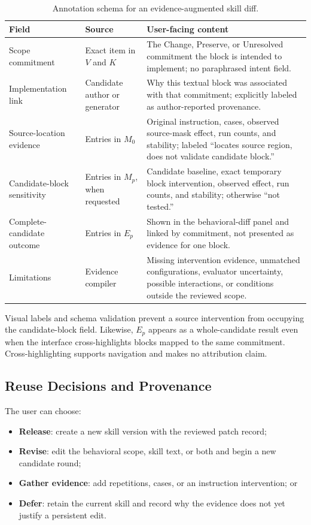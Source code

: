 \begin{table}[t]
    \caption{Annotation schema for an evidence-augmented skill diff.}
    \label{tab:diff-annotation-schema}
    \small
    \begin{tabularx}{\textwidth}{@{}p{}p{}Y@{}}
        \toprule
        \textbf{Field} & \textbf{Source} & \textbf{User-facing content} \\
        \midrule
        Scope commitment & Exact item in $V$ and $K$ & The Change, Preserve, or Unresolved commitment the block is intended to implement; no paraphrased intent field. \\
        Implementation link & Candidate author or generator & Why this textual block was associated with that commitment; explicitly labeled as author-reported provenance. \\
        Source-location evidence & Entries in $M_0$ & Original instruction, cases, observed source-mask effect, run counts, and stability; labeled ``locates source region, does not validate candidate block.'' \\
        Candidate-block sensitivity & Entries in $M_p$, when requested & Candidate baseline, exact temporary block intervention, observed effect, run counts, and stability; otherwise ``not tested.'' \\
        Complete-candidate outcome & Entries in $E_p$ & Shown in the behavioral-diff panel and linked by commitment, not presented as evidence for one block. \\
        Limitations & Evidence compiler & Missing intervention evidence, unmatched configurations, evaluator uncertainty, possible interactions, or conditions outside the reviewed scope. \\
        \bottomrule
    \end{tabularx}
\end{table}

Visual labels and schema validation prevent a source intervention from occupying the candidate-block field. Likewise, $E_p$ appears as a whole-candidate result even when the interface cross-highlights blocks mapped to the same commitment. Cross-highlighting supports navigation and makes no attribution claim.

\subsection{Reuse Decisions and Provenance}
\label{app:release-protocol}

The user can choose:
\begin{itemize}[leftmargin=*]
    \item \textbf{Release}: create a new skill version with the reviewed patch record;
    \item \textbf{Revise}: edit the behavioral scope, skill text, or both and begin a new candidate round;
    \item \textbf{Gather evidence}: add repetitions, cases, or an instruction intervention; or
    \item \textbf{Defer}: retain the current skill and record why the evidence does not yet justify a persistent edit.
\end{itemize}

